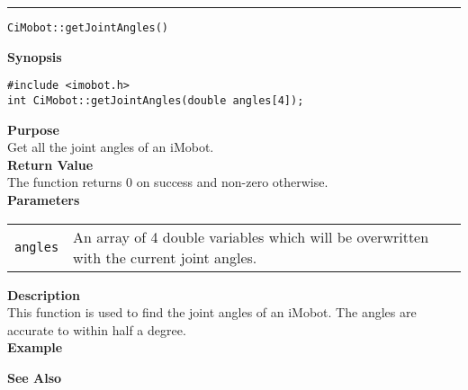 \noindent
\vspace{5pt}
\rule{6.5in}{0.015in}
\noindent
{\LARGE \texttt{CiMobot::getJointAngles()}}\\
{}

\noindent
{\bf Synopsis}\\
\begin{verbatim}
#include <imobot.h>
int CiMobot::getJointAngles(double angles[4]);
\end{verbatim}

\noindent
{\bf Purpose}\\
Get all the joint angles of an iMobot.\\

\noindent
{\bf Return Value}\\
The function returns 0 on success and non-zero otherwise.\\

\noindent
{\bf Parameters}
\vspace{-0.1in}
\begin{description}
\item               
\begin{tabular}{p{15 mm}p{145 mm}}
\texttt{angles} & An array of 4 double variables which will be overwritten with the current joint angles.
\end{tabular}
\end{description}

\noindent
{\bf Description}\\
This function is used to find the joint angles of an iMobot. The angles are accurate to
within half a degree. \\

\noindent
{\bf Example}\\
\noindent

\noindent
{\bf See Also}\\

